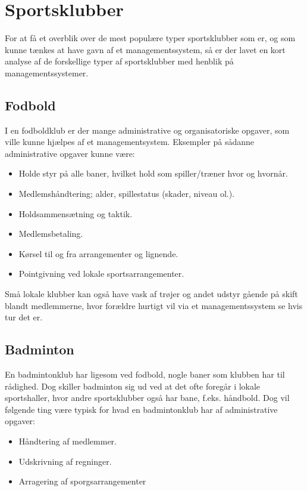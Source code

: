 \chapter{Sportsklubber}
For at få et overblik over de mest populære typer sportsklubber som er, og som kunne tænkes at have gavn af et managementssystem, så er der lavet en kort analyse af de forskellige typer af sportsklubber med henblik på managementssystemer. 
\section{Fodbold}
I en fodboldklub er der mange administrative og organisatoriske opgaver, som ville kunne hjælpes af et managementsystem. Eksempler på sådanne administrative opgaver kunne være:
\begin{itemize}
\item Holde styr på alle baner, hvilket hold som spiller/træner hvor og hvornår.
\item Medlemshåndtering; alder, spillestatus (skader, niveau ol.).
\item Holdsammensætning og taktik.
\item Medlemsbetaling.
\item Kørsel til og fra arrangementer og lignende.
\item Pointgivning ved lokale sportsarrangementer.
\end{itemize}
Små lokale klubber kan også have vask af trøjer og andet udstyr gående på skift blandt medlemmerne, hvor forældre hurtigt vil via et managementssystem se hvis tur det er. 

\section{Badminton}
En badmintonklub har ligesom ved fodbold, nogle baner som klubben har til rådighed. Dog skiller badminton sig ud ved at det ofte foregår i lokale sportshaller, hvor andre sportsklubber også har bane, f.eks. håndbold. Dog vil følgende ting være typisk for hvad en badmintonklub har af administrative opgaver:
\begin{itemize}
\item Håndtering af medlemmer.
\item Udskrivning af regninger.
\item Arragering af sporgsarrangementer
\end{itemize}

